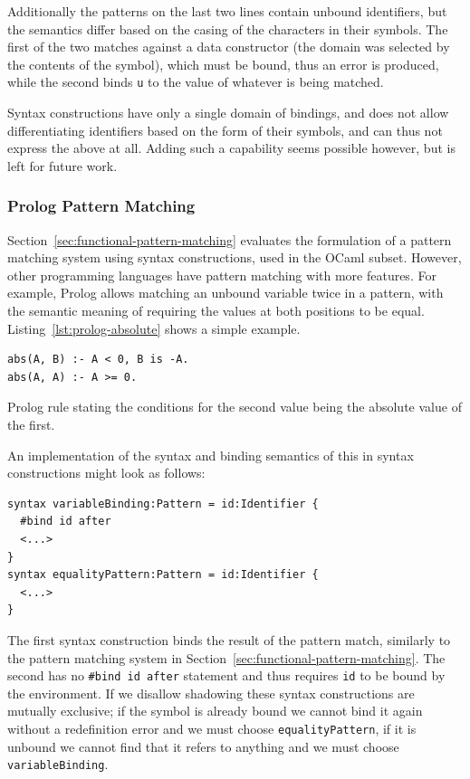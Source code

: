 \documentclass{kththesis}
\begin{document}
Additionally the patterns on the last two lines contain unbound identifiers, but the semantics differ based on the casing of the characters in their symbols. The first of the two matches against a data constructor (the domain was selected by the contents of the symbol), which must be bound, thus an error is produced, while the second binds \texttt{u} to the value of whatever is being matched.

Syntax constructions have only a single domain of bindings, and does not allow differentiating identifiers based on the form of their symbols, and can thus not express the above at all. Adding such a capability seems possible however, but is left for future work.

\subsubsection{Prolog Pattern Matching} \label{sec:prolog-pattern-matching}

Section~\ref{sec:functional-pattern-matching} evaluates the formulation of a pattern matching system using syntax constructions, used in the OCaml subset. However, other programming languages have pattern matching with more features. For example, Prolog allows matching an unbound variable twice in a pattern, with the semantic meaning of requiring the values at both positions to be equal. Listing~\ref{lst:prolog-absolute} shows a simple example.

\begin{listing}[t]
\begin{verbatim}
abs(A, B) :- A < 0, B is -A.
abs(A, A) :- A >= 0.
\end{verbatim}
\caption{Prolog rule stating the conditions for the second value being the absolute value of the first.}
\label{lst:prolog-absolute}
\end{listing}

An implementation of the syntax and binding semantics of this in syntax constructions might look as follows:

\begin{verbatim}
syntax variableBinding:Pattern = id:Identifier {
  #bind id after
  <...>
}
syntax equalityPattern:Pattern = id:Identifier {
  <...>
}
\end{verbatim}

The first syntax construction binds the result of the pattern match, similarly to the pattern matching system in Section~\ref{sec:functional-pattern-matching}. The second has no \texttt{#bind id after} statement and thus requires \texttt{id} to be bound by the environment. If we disallow shadowing these syntax constructions are mutually exclusive; if the symbol is already bound we cannot bind it again without a redefinition error and we must choose \texttt{equalityPattern}, if it is unbound we cannot find that it refers to anything and we must choose \texttt{variableBinding}.
\end{document}
